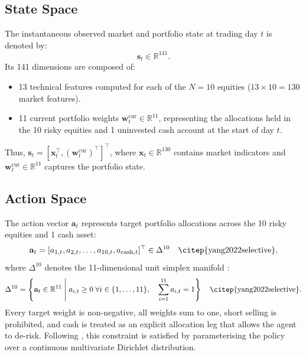 \subsection{State Space}
The instantaneous observed market and portfolio state at trading day $t$ is denoted by:
\begin{equation}
\mathbf{s}_t \in \mathbb{R}^{141}.
\end{equation}
Its 141 dimensions are composed of:
\begin{itemize}
    \setlength{\itemsep}{1pt}
    \item 13 technical features computed for each of the $N = 10$ equities ($13 \times 10 = 130$ market features).
    \item 11 current portfolio weights $\mathbf{w}_t^{\text{cur}} \in \mathbb{R}^{11}$, representing the allocations held in the 10 risky equities and 1 uninvested cash account at the start of day $t$.
\end{itemize}
Thus, $\mathbf{s}_t = [\mathbf{x}_t^\top, (\mathbf{w}_t^{\text{cur}})^\top]^\top$, where $\mathbf{x}_t \in \mathbb{R}^{130}$ contains market indicators and $\mathbf{w}_t^{\text{cur}} \in \mathbb{R}^{11}$ captures the portfolio state.

\subsection{Action Space}
The action vector $\mathbf{a}_t$ represents target portfolio allocations across the 10 risky equities and 1 cash asset:
\begin{equation}
\mathbf{a}_t = [a_{1,t}, a_{2,t}, \dots, a_{10,t}, a_{\text{cash},t}]^\top \in \Delta^{10} \quad \text{\citep{yang2022selective}},
\end{equation}
where $\Delta^{10}$ denotes the 11-dimensional unit simplex manifold \citep{yang2022selective}:
\begin{equation}
\label{eq:simplex_def}
\Delta^{10} = \left\{ \mathbf{a}_t \in \mathbb{R}^{11} \;\middle|\; a_{i,t} \ge 0 \; \forall i \in \{1, \dots, 11\}, \quad \sum_{i=1}^{11} a_{i,t} = 1 \right\} \quad \text{\citep{yang2022selective}}.
\end{equation}
Every target weight is non-negative, all weights sum to one, short selling is prohibited, and cash is treated as an explicit allocation leg that allows the agent to de-risk. Following \citet{yang2022selective}, this constraint is satisfied by parameterising the policy over a continuous multivariate Dirichlet distribution.

